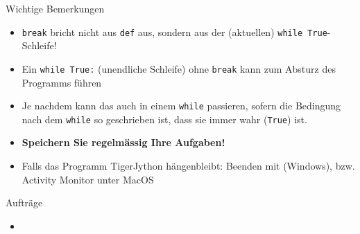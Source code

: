 \begin{frame}[fragile]{Wichtige Bemerkungen}
    \begin{itemize}[<+->]
        \item \lstinline|break| bricht nicht aus \lstinline|def| aus, sondern aus der (aktuellen) \lstinline|while True|-Schleife!
        \item Ein \lstinline|while True:| (unendliche Schleife) ohne \lstinline|break| kann zum Absturz des Programms führen 
        \item Je nachdem kann das auch in einem \lstinline|while| passieren, sofern die Bedingung nach dem \lstinline|while| so geschrieben ist, dass sie immer wahr (\lstinline|True|) ist.
        \item \textbf{Speichern Sie regelmässig Ihre Aufgaben!}
        \item Falls das Programm TigerJython hängenbleibt: Beenden mit  (Windows), bzw. Activity Monitor unter MacOS
    \end{itemize}
\end{frame}

\begin{frame}[fragile]{Aufträge}
    \begin{itemize}
        \item {}
    \end{itemize}
\end{frame}

